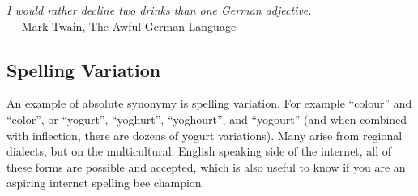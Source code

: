 \begin{center}
\textit{I would rather decline two drinks than one German adjective.}
\\ --- Mark Twain, The Awful German Language
\end{center}

\subsection{Spelling Variation}
An example of absolute synonymy is spelling variation. For example ``colour'' and ``color'', or ``yogurt'', ``yoghurt'', ``yoghourt'', and ``yogourt'' (and when combined with inflection, there are dozens of yogurt variations). Many arise from regional dialects, but on the multicultural, English speaking side of the internet, all of these forms are possible and accepted, which is also useful to know if you are an aspiring internet spelling bee champion.



